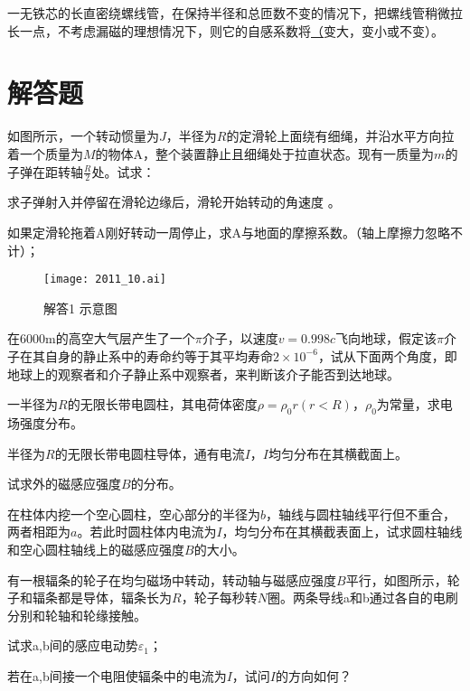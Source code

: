 一无铁芯的长直密绕螺线管，在保持半径和总匝数不变的情况下，把螺线管稍微拉长一点，不考虑漏磁的理想情况下，则它的自感系数将\ul（变大，变小或不变）。


\section{解答题}%
如图所示，一个转动惯量为$J$，半径为$R$的定滑轮上面绕有细绳，并沿水平方向拉着一个质量为$M$的物体A，整个装置静止且细绳处于拉直状态。现有一质量为$m$的子弹在距转轴$\frac{R}{2}$处。试求：

求子弹射入并停留在滑轮边缘后，滑轮开始转动的角速度 。

如果定滑轮拖着A刚好转动一周停止，求A与地面的摩擦系数。（轴上摩擦力忽略不计）；

\begin{figure}
	\begin{flushright}
		\texttt{[image: 2011\_10.ai]}
		\caption{解答1 示意图}
	\end{flushright}
\end{figure}

在6000m的高空大气层产生了一个$\pi$介子，以速度$v=0.998c$飞向地球，假定该$\pi$介子在其自身的静止系中的寿命约等于其平均寿命$2\times 10^{-6}$，试从下面两个角度，即地球上的观察者和介子静止系中观察者，来判断该介子能否到达地球。

一半径为$R$的无限长带电圆柱，其电荷体密度$\rho=\rho_0r(r<R)$，$\rho_0$为常量，求电场强度分布。

半径为$R$的无限长带电圆柱导体，通有电流$I$，$I$均匀分布在其横截面上。

试求外的磁感应强度$B$的分布。

在柱体内挖一个空心圆柱，空心部分的半径为$b$，轴线与圆柱轴线平行但不重合，两者相距为$a$。若此时圆柱体内电流为$I$，均匀分布在其横截表面上，试求圆柱轴线和空心圆柱轴线上的磁感应强度$B$的大小。

有一根辐条的轮子在均匀磁场中转动，转动轴与磁感应强度$B$平行，如图所示，轮子和辐条都是导体，辐条长为$R$，轮子每秒转$N$圈。两条导线a和b通过各自的电刷分别和轮轴和轮缘接触。

试求a,b间的感应电动势$\varepsilon_1$；

若在a,b间接一个电阻使辐条中的电流为$I$，试问$I$的方向如何？

